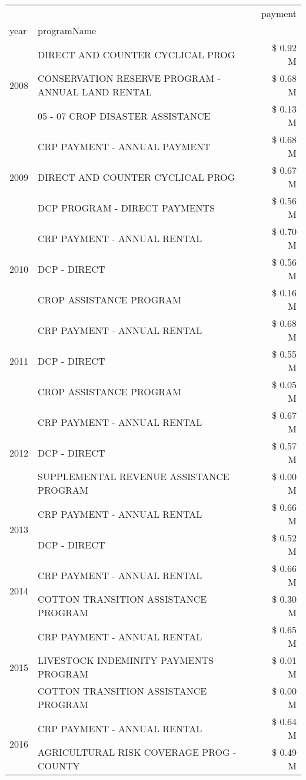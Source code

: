 \begin{tabular}{llr}
\toprule
 &  & payment \\
year & programName &  \\
\midrule
\multirow[t]{3}{*}{2008} & DIRECT AND COUNTER CYCLICAL PROG & \$ 0.92 M \\
 & CONSERVATION RESERVE PROGRAM - ANNUAL LAND RENTAL & \$ 0.68 M \\
 & 05 - 07 CROP DISASTER ASSISTANCE & \$ 0.13 M \\
\cline{1-3}
\multirow[t]{3}{*}{2009} & CRP PAYMENT - ANNUAL PAYMENT & \$ 0.68 M \\
 & DIRECT AND COUNTER CYCLICAL PROG & \$ 0.67 M \\
 & DCP PROGRAM - DIRECT PAYMENTS & \$ 0.56 M \\
\cline{1-3}
\multirow[t]{3}{*}{2010} & CRP PAYMENT - ANNUAL RENTAL & \$ 0.70 M \\
 & DCP - DIRECT & \$ 0.56 M \\
 & CROP ASSISTANCE PROGRAM & \$ 0.16 M \\
\cline{1-3}
\multirow[t]{3}{*}{2011} & CRP PAYMENT - ANNUAL RENTAL & \$ 0.68 M \\
 & DCP - DIRECT & \$ 0.55 M \\
 & CROP ASSISTANCE PROGRAM & \$ 0.05 M \\
\cline{1-3}
\multirow[t]{3}{*}{2012} & CRP PAYMENT - ANNUAL RENTAL & \$ 0.67 M \\
 & DCP - DIRECT & \$ 0.57 M \\
 & SUPPLEMENTAL REVENUE ASSISTANCE PROGRAM & \$ 0.00 M \\
\cline{1-3}
\multirow[t]{2}{*}{2013} & CRP PAYMENT - ANNUAL RENTAL & \$ 0.66 M \\
 & DCP - DIRECT & \$ 0.52 M \\
\cline{1-3}
\multirow[t]{2}{*}{2014} & CRP PAYMENT - ANNUAL RENTAL & \$ 0.66 M \\
 & COTTON TRANSITION ASSISTANCE PROGRAM & \$ 0.30 M \\
\cline{1-3}
\multirow[t]{3}{*}{2015} & CRP PAYMENT - ANNUAL RENTAL & \$ 0.65 M \\
 & LIVESTOCK INDEMINITY PAYMENTS PROGRAM & \$ 0.01 M \\
 & COTTON TRANSITION ASSISTANCE PROGRAM & \$ 0.00 M \\
\cline{1-3}
\multirow[t]{3}{*}{2016} & CRP PAYMENT - ANNUAL RENTAL & \$ 0.64 M \\
 & AGRICULTURAL RISK COVERAGE PROG - COUNTY & \$ 0.49 M \\

\end{tabular}
